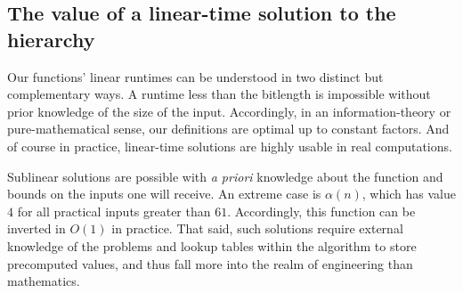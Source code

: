 \newcommand{\ackt}{\ensuremath{\hat{\alpha}}}

\subsection{The value of a linear-time solution to the hierarchy}

Our functions' linear runtimes can be understood in two distinct but
complementary ways.  A runtime less than the bitlength is impossible
without prior knowledge of the size of the input.  Accordingly, in
an information-theory or pure-mathematical sense, our definitions are
optimal up to constant factors.  And of course in practice, linear-time
solutions are highly usable in real computations.

Sublinear solutions are possible with \emph{a priori} knowledge about
the function and bounds on the inputs one will receive.
An extreme case is $\alpha(n)$, which has value $4$ for all practical
inputs greater than $61$. Accordingly,
this function can be inverted in $O(1)$ in practice.  That said, 
such solutions require external knowledge of the problems and
lookup tables within the algorithm to store precomputed
values, and thus fall more into the realm of engineering than mathematics. 


